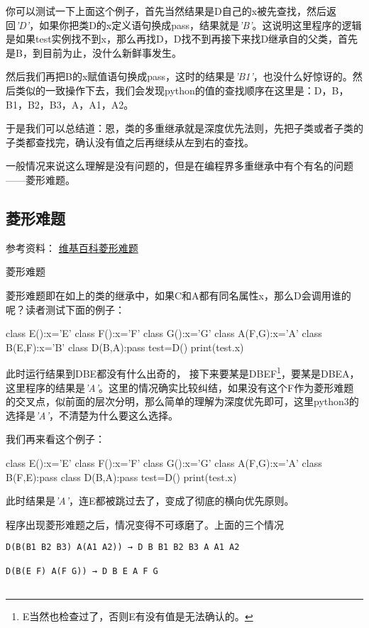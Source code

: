 \documentclass[12pt,oneside]{book}
\begin{document}
\begin{common-format}
你可以测试一下上面这个例子，首先当然结果是D自己的x被先查找，然后返回\emph{'D'}，如果你把类D的x定义语句换成pass，结果就是\emph{'B'}。这说明这里程序的逻辑是如果test实例找不到x，那么再找D，D找不到再接下来找D继承自的父类，首先是B，到目前为止，没什么新鲜事发生。

然后我们再把B的x赋值语句换成pass，这时的结果是\emph{'B1'}，也没什么好惊讶的。然后类似的一致操作下去，我们会发现python的值的查找顺序在这里是：D，B，B1，B2，B3，A，A1，A2。

于是我们可以总结道：恩，类的多重继承就是深度优先法则，先把子类或者子类的子类都查找完，确认没有值之后再继续从左到右的查找。


一般情况来说这么理解是没有问题的，但是在编程界多重继承中有个有名的问题——菱形难题。

\subsection{菱形难题}
参考资料： \href{http://en.wikipedia.org/wiki/Multiple_inheritance#The_diamond_problem}{维基百科菱形难题}

\begin{fig}{菱形难题}
\caption{菱形难题}
\label{fig:菱形难题}
\end{fig}

菱形难题即在如上的类的继承中，如果C和A都有同名属性x，那么D会调用谁的呢？读者测试下面的例子：
\begin{tcbpython}[]
class E():x='E'
class F():x='F'
class G():x='G'
class A(F,G):x='A'
class B(E,F):x='B'
class D(B,A):pass
test=D()
print(test.x)
\end{tcbpython}
此时运行结果到DBE都没有什么出奇的， 接下来要某是DBEF\footnote{E当然也检查过了，否则E有没有值是无法确认的。}，要某是DBEA，这里程序的结果是\emph{'A'}。这里的情况确实比较纠结，如果没有这个F作为菱形难题的交叉点，似前面的层次分明，那么简单的理解为深度优先即可，这里python3的选择是\emph{'A'}，不清楚为什么要这么选择。

我们再来看这个例子：
\begin{tcbpython}[]
class E():x='E'
class F():x='F'
class G():x='G'
class A(F,G):x='A'
class B(F,E):pass
class D(B,A):pass
test=D()
print(test.x)
\end{tcbpython}
此时结果是\emph{'A'}，连E都被跳过去了，变成了彻底的横向优先原则。

程序出现菱形难题之后，情况变得不可琢磨了。上面的三个情况
\begin{Verbatim}
D(B(B1 B2 B3) A(A1 A2)) → D B B1 B2 B3 A A1 A2

D(B(E F) A(F G)) → D B E A F G


\end{Verbatim}
\end{common-format}
\end{document}
